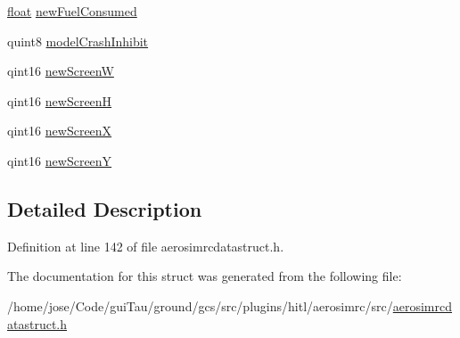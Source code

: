 \begin{DoxyCompactItemize}
\hyperlink{_super_l_u_support_8h_a6a1bb6ed41f44b60e7bd83b0e9945aa7}{float} \hyperlink{group___aero_sim_r_c_ga8a8341d7559a5dfa620a7c486f2dc023}{new\-Fuel\-Consumed}
\item 
quint8 \hyperlink{group___aero_sim_r_c_gac766c17be7565d11f169ec43dac2113d}{model\-Crash\-Inhibit}
\item 
qint16 \hyperlink{group___aero_sim_r_c_ga73893f1a06af3481486ee34ef91001c0}{new\-Screen\-W}
\item 
qint16 \hyperlink{group___aero_sim_r_c_ga6ac6931958ba1a74ff06dbfe7dba5676}{new\-Screen\-H}
\item 
qint16 \hyperlink{group___aero_sim_r_c_gacb23e684331322adcce5771dc717ea18}{new\-Screen\-X}
\item 
qint16 \hyperlink{group___aero_sim_r_c_gad5aa10f7542e0fcf3d4ac3981efc93a2}{new\-Screen\-Y}
\end{DoxyCompactItemize}


\subsection{Detailed Description}


Definition at line 142 of file aerosimrcdatastruct.\-h.



The documentation for this struct was generated from the following file\-:\begin{DoxyCompactItemize}
\item 
/home/jose/\-Code/gui\-Tau/ground/gcs/src/plugins/hitl/aerosimrc/src/\hyperlink{aerosimrcdatastruct_8h}{aerosimrcdatastruct.\-h}\end{DoxyCompactItemize}
